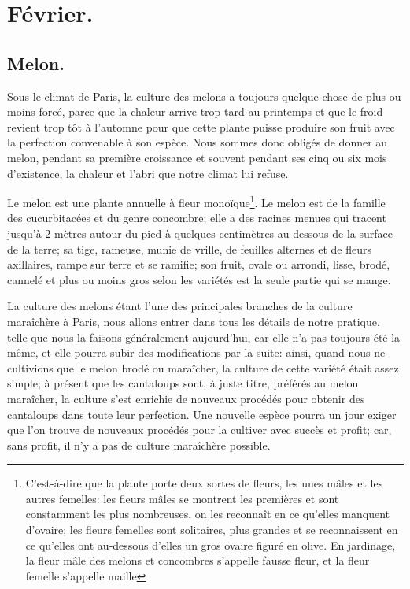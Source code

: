 \documentclass[10pt,a4paper]{book}
\begin{document}
\section{Février.}

\subsection{Melon.}

Sous le climat de Paris, la culture des melons a toujours quelque chose de plus ou moins forcé, parce que la chaleur arrive trop tard au printemps et que le froid revient trop tôt à l'automne pour que cette plante puisse produire son fruit avec la perfection convenable à son espèce. Nous sommes donc obligés de donner au melon, pendant sa première croissance et souvent pendant ses cinq ou six mois d'existence, la chaleur et l'abri que notre climat lui refuse.

Le melon est une plante annuelle à fleur monoïque\footnote{C'est-à-dire que la plante porte deux sortes de fleurs, les unes mâles et les autres femelles: les fleurs mâles se montrent les premières et sont constamment les plus nombreuses, on les reconnaît en ce qu'elles manquent d'ovaire; les fleurs femelles sont solitaires, plus grandes et se reconnaissent en ce qu'elles ont au-dessous d'elles un gros ovaire figuré en olive. En jardinage, la fleur mâle des melons et concombres s'appelle fausse fleur, et la fleur femelle s'appelle maille}. Le melon est de la famille des cucurbitacées et du genre concombre; elle a des racines menues qui tracent jusqu'à 2 mètres autour du pied à quelques centimètres au-dessous de la surface de la terre; sa tige, rameuse, munie de vrille, de feuilles alternes et de fleurs axillaires, rampe sur terre et se ramifie; son fruit, ovale ou arrondi, lisse, brodé, cannelé et plus ou moins gros selon les variétés est la seule partie qui se mange.

La culture des melons étant l'une des principales branches de la culture maraîchère à Paris, nous allons entrer dans tous les détails de notre pratique, telle que nous la faisons généralement aujourd'hui, car elle n'a pas toujours été la même, et elle pourra subir des modifications par la suite: ainsi, quand nous ne cultivions que le melon brodé ou maraîcher, la culture de cette variété était assez simple; à présent que les cantaloups sont, à juste titre, préférés au melon maraîcher, la culture s'est enrichie de nouveaux procédés pour obtenir des cantaloups dans toute leur perfection. Une nouvelle espèce pourra un jour exiger que l'on trouve de nouveaux procédés pour la cultiver avec succès et profit; car, sans profit, il n'y a pas de culture maraîchère possible.
\end{document}
